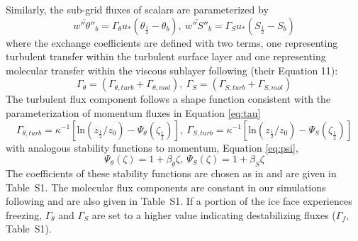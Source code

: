 \documentclass[tc, manuscript]{copernicus}
\begin{document}
Similarly, the sub-grid fluxes of scalars are parameterized by
\begin{equation} \label{eq:melt_flux}
    \overline{w''\theta''}_b = \Gamma_{\theta} u_* \left(\theta_{\frac{1}{2}} - \theta_b\right),\: 
    \overline{w''S''}_b = \Gamma_S u_* \left(S_{\frac{1}{2}} - S_b\right)
\end{equation}
%
where the exchange coefficients are defined with two terms, one representing turbulent transfer within the turbulent surface layer and one representing molecular transfer within the viscous sublayer following \citet{mcphee_dynamics_1987} (their Equation 11):
\begin{equation} \label{eq:gamma}
    \Gamma_{\theta} = \left(\Gamma_{\theta,turb} + \Gamma_{\theta,mol}\right),\:
    \Gamma_S = \left(\Gamma_{S,turb} + \Gamma_{S,mol}\right)
\end{equation}
%
The turbulent flux component follows a shape function consistent with the parameterization of momentum fluxes in Equation \ref{eq:tau}
\begin{equation} \label{eq:gamma_turb}
    \Gamma_{\theta,turb} = \kappa^{-1} \left[\textrm{ln}\left(z_{\frac{1}{2}}/z_0\right) - \Psi_{\theta}\left(\zeta_{\frac{1}{2}}\right)\right], \:
    \Gamma_{S,turb} = \kappa^{-1} \left[\textrm{ln}\left(z_{\frac{1}{2}}/z_0\right) - \Psi_S\left(\zeta_{\frac{1}{2}}\right)\right]
\end{equation}
with analogous stability functions to momentum, Equation \ref{eq:psi},
\begin{equation}
    \Psi_{\theta}(\zeta) = 1 + \beta_{\theta}\zeta, \:
    \Psi_{S}(\zeta) = 1 + \beta_{S}\zeta
\end{equation}
The coefficients of these stability functions are chosen as in \citet{zhou_self-similar_2017} and are given in Table~S1. The molecular flux components are constant in our simulations following \citet{mcphee_dynamics_1987} and are also given in Table~S1. If a portion of the ice face experiences freezing, $\Gamma_\theta$ and $\Gamma_S$ are set to a higher value indicating destabilizing fluxes ($\Gamma_{f}$, Table~S1).
\end{document}
